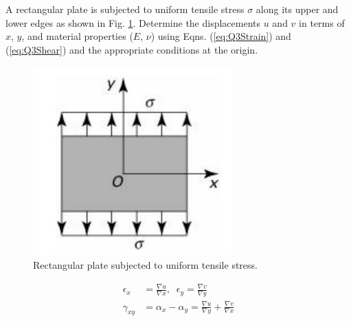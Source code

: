\section{}

A rectangular plate is subjected to uniform tensile stress $\sigma$ along its upper and 
lower edges as shown in Fig. \ref{fig:Q3}. Determine the displacements $u$ and $v$ in terms 
of $x$, $y$, and material properties ($E$, $\nu$) using Eqns. (\ref{eq:Q3Strain}) and (\ref{eq:Q3Shear}) and the appropriate 
conditions at the origin.

\begin{figure}[h]
    \centering
    \includegraphics[width=0.5\linewidth]{Questions/Figures/Q3ProblemDiagram.png}
    \caption{Rectangular plate subjected to uniform tensile stress.}
    \label{fig:Q3}
\end{figure}

\begin{align}
    \epsilon_x &= \frac{\nabla u}{\nabla x}, \;\; \epsilon_y = \frac{\nabla v}{\nabla y} \label{eq:Q3Strain} \\
    \gamma_{xy} &= \alpha_x - \alpha_y = \frac{\nabla u}{\nabla y} + \frac{\nabla v}{\nabla x} \label{eq:Q3Shear}
\end{align}

